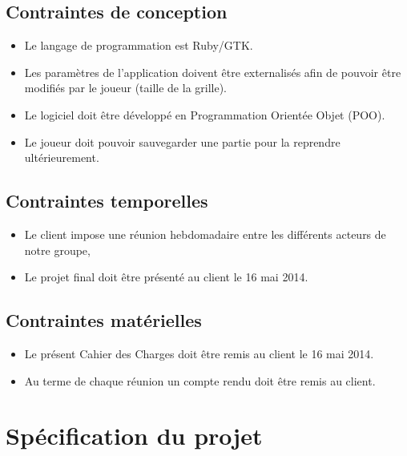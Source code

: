 \documentclass[11pt]{article}
\begin{document}
\subsection{Contraintes de conception}


\begin{itemize}
   \item Le langage de programmation est Ruby/GTK.
   \item Les paramètres de l’application doivent être externalisés afin de pouvoir être modifiés par le joueur (taille
       de la grille).
   \item Le logiciel doit être développé en Programmation Orientée Objet (POO).
   \item Le joueur doit pouvoir sauvegarder une partie pour la reprendre ultérieurement.
\end{itemize}




\subsection{Contraintes temporelles}


\begin{itemize}
    \item Le client impose une réunion hebdomadaire entre les différents acteurs de notre groupe,
    \item Le projet final doit être présenté au client le 16 mai 2014.
\end{itemize}




\subsection{Contraintes matérielles}


\begin{itemize}
    \item Le présent Cahier des Charges doit être remis au client le 16 mai 2014.
    \item Au terme de chaque réunion un compte rendu doit être remis au client.
\end{itemize}




\section{Spécification du projet}
\end{document}
